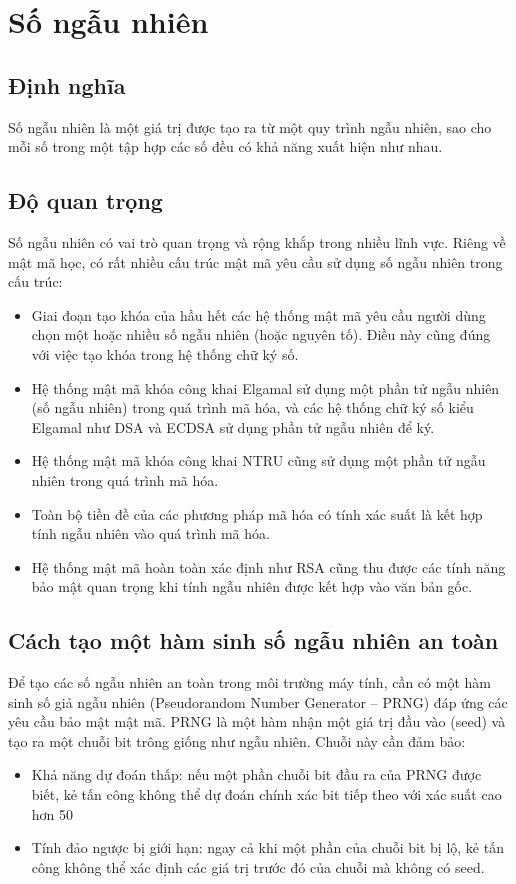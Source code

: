 \documentclass[a4paper,12pt]{article}
\begin{document}
\section{Số ngẫu nhiên}
\subsection{Định nghĩa}
Số ngẫu nhiên là một giá trị được tạo ra từ một quy trình ngẫu nhiên, sao cho mỗi số trong một tập hợp các số đều có khả năng xuất hiện như nhau.

\subsection{Độ quan trọng}
Số ngẫu nhiên có vai trò quan trọng và rộng khắp trong nhiều lĩnh vực. Riêng về mật mã học, có rất nhiều cấu trúc mật mã yêu cầu sử dụng số ngẫu nhiên trong cấu trúc:
\begin{itemize}
    \item Giai đoạn tạo khóa của hầu hết các hệ thống mật mã yêu cầu người dùng chọn một hoặc nhiều số ngẫu nhiên (hoặc nguyên tố). Điều này cũng đúng với việc tạo khóa trong hệ thống chữ ký số.
    \item Hệ thống mật mã khóa công khai Elgamal sử dụng một phần tử ngẫu nhiên (số ngẫu nhiên) trong quá trình mã hóa, và các hệ thống chữ ký số kiểu Elgamal như DSA và ECDSA sử dụng phần tử ngẫu nhiên để ký.
    \item Hệ thống mật mã khóa công khai NTRU cũng sử dụng một phần tử ngẫu nhiên trong quá trình mã hóa.
    \item Toàn bộ tiền đề của các phương pháp mã hóa có tính xác suất là kết hợp tính ngẫu nhiên vào quá trình mã hóa.
    \item Hệ thống mật mã hoàn toàn xác định như RSA cũng thu được các tính năng bảo mật quan trọng khi tính ngẫu nhiên được kết hợp vào văn bản gốc.
\end{itemize}

\subsection{Cách tạo một hàm sinh số ngẫu nhiên an toàn}
Để tạo các số ngẫu nhiên an toàn trong môi trường máy tính, cần có một hàm sinh số giả ngẫu nhiên (Pseudorandom Number Generator – PRNG) đáp ứng các yêu cầu bảo mật mật mã. PRNG là một hàm nhận một giá trị đầu vào (seed) và tạo ra một chuỗi bit trông giống như ngẫu nhiên. Chuỗi này cần đảm bảo:
\begin{itemize}
    \item Khả năng dự đoán thấp: nếu một phần chuỗi bit đầu ra của PRNG được biết, kẻ tấn công không thể dự đoán chính xác bit tiếp theo với xác suất cao hơn 50%
    \item Tính đảo ngược bị giới hạn: ngay cả khi một phần của chuỗi bit bị lộ, kẻ tấn công không thể xác định các giá trị trước đó của chuỗi mà không có seed.
\end{itemize}
\end{document}
